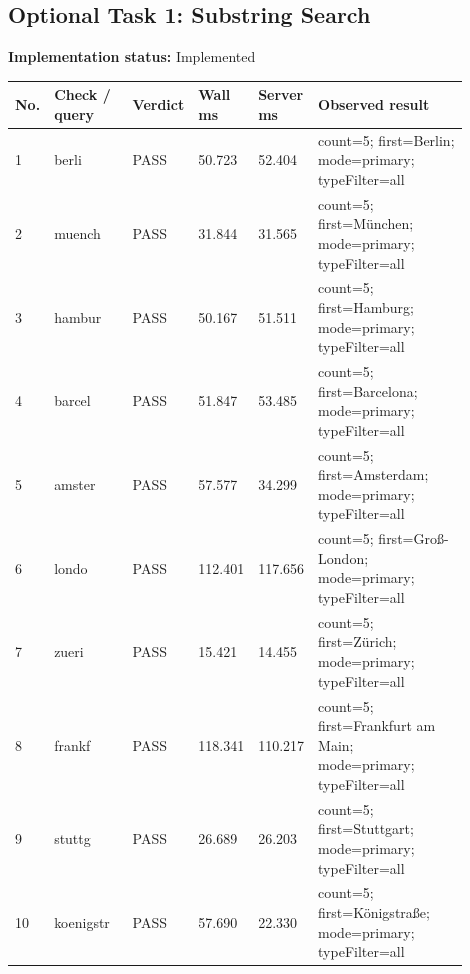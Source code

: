 \documentclass[10pt,a4paper]{article}
\begin{document}
\subsection{Optional Task 1: Substring Search}
\textbf{Implementation status:} Implemented\\
\scriptsize
\begin{longtable}{|P{0.045\linewidth}|P{0.19\linewidth}|P{0.105\linewidth}|P{0.085\linewidth}|P{0.085\linewidth}|P{0.385\linewidth}|}
\hline
\textbf{No.} & \textbf{Check / query} & \textbf{Verdict} & \textbf{Wall ms} & \textbf{Server ms} & \textbf{Observed result}\\ \hline
{} 1 & berli & PASS & 50.723 & 52.404 & count=5; first=Berlin; mode=primary; typeFilter=all\\ \hline
{} 2 & muench & PASS & 31.844 & 31.565 & count=5; first=München; mode=primary; typeFilter=all\\ \hline
{} 3 & hambur & PASS & 50.167 & 51.511 & count=5; first=Hamburg; mode=primary; typeFilter=all\\ \hline
{} 4 & barcel & PASS & 51.847 & 53.485 & count=5; first=Barcelona; mode=primary; typeFilter=all\\ \hline
{} 5 & amster & PASS & 57.577 & 34.299 & count=5; first=Amsterdam; mode=primary; typeFilter=all\\ \hline
{} 6 & londo & PASS & 112.401 & 117.656 & count=5; first=Groß-London; mode=primary; typeFilter=all\\ \hline
{} 7 & zueri & PASS & 15.421 & 14.455 & count=5; first=Zürich; mode=primary; typeFilter=all\\ \hline
{} 8 & frankf & PASS & 118.341 & 110.217 & count=5; first=Frankfurt am Main; mode=primary; typeFilter=all\\ \hline
{} 9 & stuttg & PASS & 26.689 & 26.203 & count=5; first=Stuttgart; mode=primary; typeFilter=all\\ \hline
{} 10 & koenigstr & PASS & 57.690 & 22.330 & count=5; first=Königstraße; mode=primary; typeFilter=all\\ \hline
\end{longtable}
\normalsize
\end{document}
